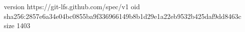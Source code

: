 version https://git-lfs.github.com/spec/v1
oid sha256:2857e6a34e04bc0855ba9f336966149b8b1d29e1a22eb9532b425daf9dd8463c
size 1403
